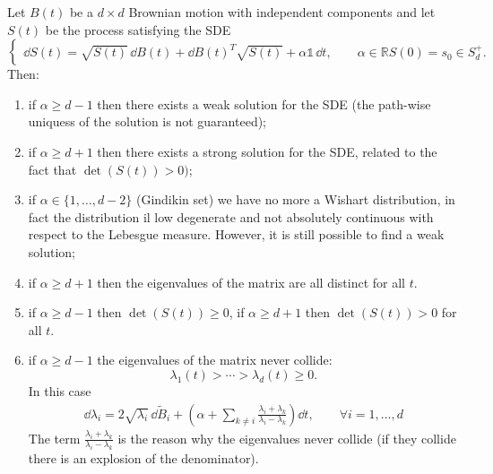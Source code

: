 \begin{theorem}
    Let $B(t)$ be a $d\times d$ Brownian motion with independent components and let $S(t)$ be the process satisfying the SDE
    \begin{equation}
    \begin{cases}
    \dd S(t) = \sqrt{S(t)}\,\dd B(t) + \dd B(t)^T\sqrt{S(t)} + \alpha\mathds{1}\,\dd t, \qquad \alpha\in\mathbb{R}
    S(0) = s_0 \in S_d^+.
    \end{cases}
    \end{equation}
    Then:
    \begin{enumerate}
        \item if $\alpha\ge d-1$ then there exists a weak solution for the SDE (the path-wise uniquess of the solution is not guaranteed);
        \item if $\alpha\ge d+1$ then there exists a strong solution for the SDE, related to the fact that $\det(S(t))>0)$;
        \item if $\alpha\in\{1,\dots,d-2\}$ (Gindikin set) we have no more a Wishart distribution, in fact the distribution il low degenerate and not absolutely continuous with respect to the Lebesgue measure. However, it is still possible to find a weak solution;
        \item if $\alpha\ge d+1$ then the eigenvalues of the matrix are all distinct for all $t$.
        \item if $\alpha\ge d-1$ then $\det(S(t))\ge0$, if $\alpha\ge d+1$ then $\det(S(t))>0$ for all $t$.
        \item if $\alpha\ge d-1$ the eigenvalues of the matrix never collide:
        \begin{equation*}
            \lambda_1(t) > \cdots > \lambda_d(t) \ge 0.
        \end{equation*}
        In this case
        \begin{align*}
            \dd \lambda_i = 2\sqrt{\lambda_i}\,\dd \tilde{B}_i + \left(\alpha+\sum_{k\ne i} \frac{\lambda_i + \lambda_k}{\lambda_i - \lambda_k}\right)\dd t, \qquad \forall i = 1,\dots,d
        \end{align*}
        The term $\tfrac{\lambda_i + \lambda_k}{\lambda_i - \lambda_k}$ is the reason why the eigenvalues never collide (if they collide there is an explosion of the denominator).
    \end{enumerate}
\end{theorem}

